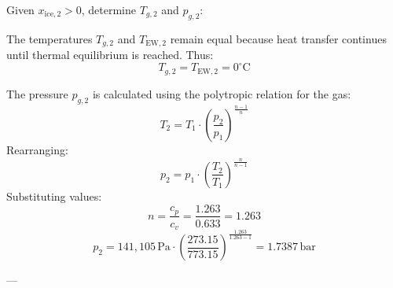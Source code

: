 Given \( x_{\text{ice},2} > 0 \), determine \( T_{g,2} \) and \( p_{g,2} \):  

The temperatures \( T_{g,2} \) and \( T_{\text{EW},2} \) remain equal because heat transfer continues until thermal equilibrium is reached. Thus:  
\[
T_{g,2} = T_{\text{EW},2} = 0^\circ\text{C}
\]  

The pressure \( p_{g,2} \) is calculated using the polytropic relation for the gas:  
\[
T_2 = T_1 \cdot \left( \frac{p_2}{p_1} \right)^{\frac{n-1}{n}}
\]  
Rearranging:  
\[
p_2 = p_1 \cdot \left( \frac{T_2}{T_1} \right)^{\frac{n}{n-1}}
\]  
Substituting values:  
\[
n = \frac{c_p}{c_v} = \frac{1.263}{0.633} = 1.263
\]  
\[
p_2 = 141{,}105 \, \text{Pa} \cdot \left( \frac{273.15}{773.15} \right)^{\frac{1.263}{1.263 - 1}} = 1.7387 \, \text{bar}
\]  

---